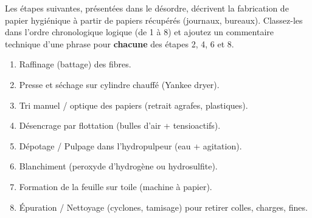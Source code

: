 \documentclass[11pt]{article}
\begin{document}
\begin{exercice}
Les étapes suivantes, présentées dans le désordre, décrivent la fabrication de papier hygiénique à partir de papiers récupérés (journaux, bureaux). Classez-les dans l'ordre chronologique logique (de 1 à 8) et ajoutez un commentaire technique d'une phrase pour \textbf{chacune} des étapes 2, 4, 6 et 8.
\begin{enumerate}
    \item Raffinage (battage) des fibres.
    \item Presse et séchage sur cylindre chauffé (Yankee dryer).
    \item Tri manuel / optique des papiers (retrait agrafes, plastiques).
    \item Désencrage par flottation (bulles d'air + tensioactifs).
    \item Dépotage / Pulpage dans l'hydropulpeur (eau + agitation).
    \item Blanchiment (peroxyde d'hydrogène  ou hydrosulfite).
    \item Formation de la feuille sur toile (machine à papier).
    \item Épuration / Nettoyage (cyclones, tamisage) pour retirer colles, charges, fines.
\end{enumerate}
\end{exercice}
\end{document}
